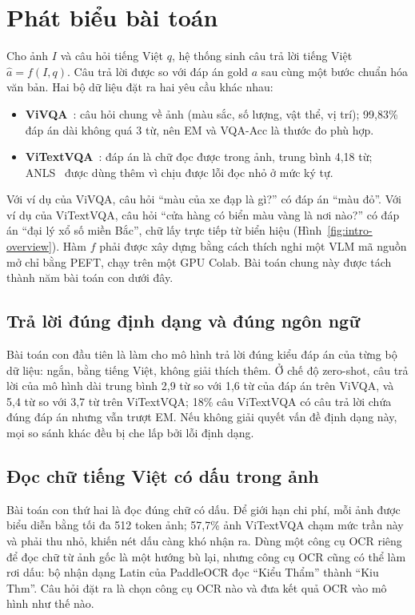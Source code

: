 \section{Phát biểu bài toán}
\label{sec:intro-problem}

Cho ảnh $I$ và câu hỏi tiếng Việt $q$, hệ thống sinh câu trả lời tiếng Việt
$\hat{a} = f(I, q)$. Câu trả lời được so với đáp án gold $a$ sau cùng một bước
chuẩn hóa văn bản. Hai bộ dữ liệu đặt ra hai yêu cầu khác nhau:

\begin{itemize}
  \item \textbf{ViVQA}~\cite{tran2021vivqa}: câu hỏi chung về ảnh (màu sắc, số
  lượng, vật thể, vị trí); 99,83\% đáp án dài không quá 3 từ, nên EM và VQA-Acc
  là thước đo phù hợp.
  \item \textbf{ViTextVQA}~\cite{nguyen2024vitextvqa}: đáp án là chữ đọc được
  trong ảnh, trung bình 4,18 từ; ANLS~\cite{biten2019stvqa} được dùng thêm vì
  chịu được lỗi đọc nhỏ ở mức ký tự.
\end{itemize}

Với ví dụ của ViVQA, câu hỏi ``màu của xe đạp là gì?'' có đáp án ``màu đỏ''. Với
ví dụ của ViTextVQA, câu hỏi ``cửa hàng có biển màu vàng là nơi nào?'' có đáp án
``đại lý xổ số miền Bắc'', chữ lấy trực tiếp từ biển hiệu
(Hình~\ref{fig:intro-overview}). Hàm $f$ phải được xây dựng bằng cách thích nghi
một VLM mã nguồn mở chỉ bằng PEFT, chạy trên một GPU Colab. Bài toán chung này
được tách thành năm bài toán con dưới đây.

\subsection{Trả lời đúng định dạng và đúng ngôn ngữ}

Bài toán con đầu tiên là làm cho mô hình trả lời đúng kiểu đáp án của từng bộ dữ
liệu: ngắn, bằng tiếng Việt, không giải thích thêm. Ở chế độ zero-shot, câu trả
lời của mô hình dài trung bình 2,9 từ so với 1,6 từ của đáp án trên ViVQA, và
5,4 từ so với 3,7 từ trên ViTextVQA; 18\% câu ViTextVQA có câu trả lời chứa đúng
đáp án nhưng vẫn trượt EM. Nếu không giải quyết vấn đề định dạng này, mọi so
sánh khác đều bị che lấp bởi lỗi định dạng.

\subsection{Đọc chữ tiếng Việt có dấu trong ảnh}

Bài toán con thứ hai là đọc đúng chữ có dấu. Để giới hạn chi phí, mỗi ảnh được
biểu diễn bằng tối đa 512 token ảnh; 57,7\% ảnh ViTextVQA chạm mức trần này và
phải thu nhỏ, khiến nét dấu càng khó nhận ra. Dùng một công cụ OCR riêng để đọc
chữ từ ảnh gốc là một hướng bù lại, nhưng công cụ OCR cũng có thể làm rơi dấu: bộ
nhận dạng Latin của PaddleOCR đọc ``Kiểu Thẩm'' thành ``Kiu Thm''. Câu hỏi đặt ra
là chọn công cụ OCR nào và đưa kết quả OCR vào mô hình như thế nào.

